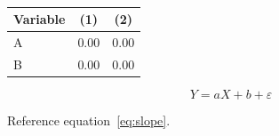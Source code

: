 \documentclass{article}
\begin{document}
\begin{table}[htbp]
	\centering
	\caption{}\label{tab:tab1}
	\begin{tabular}{lcc}
		\toprule
		Variable & (1)  & (2)  \\
		\midrule
		A        & 0.00 & 0.00 \\
		B        & 0.00 & 0.00 \\
		\bottomrule
	\end{tabular}
\end{table}


\begin{equation}
	Y = aX + b + \varepsilon \label{eq:slope}
\end{equation}



Reference equation~\eqref{eq:slope}.
\end{document}
